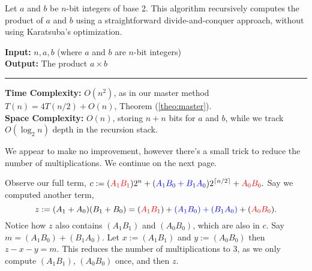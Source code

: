 \begin{Func}
    Let $a$ and $b$ be $n$-bit integers of base 2. This algorithm recursively computes the product of $a$ and $b$ using a straightforward divide-and-conquer approach, without using Karatsuba's optimization.

    \vspace{.5em}
    \noindent
    \textbf{Input:} $n, a, b$ (where $a$ and $b$ are $n$-bit integers)\\
    \textbf{Output:} The product $a \times b$\\

    \begin{algorithm}[H]
        \SetAlgoLined
    \end{algorithm}
    \noindent\rule{\textwidth}{0.4pt}

    \noindent
    \textbf{Time Complexity:} $O(n^2)$, as in our master method $T(n)=4T(n/2)+O(n)$, Theorem (\ref{theo:master}).\\
    \textbf{Space Complexity:} $O(n)$, storing $n+n$ bits for $a$ and $b$, while we track $O(\log_2 n)$ depth in the recursion stack.
\end{Func}
\noindent
We appear to make no improvement, however there's a small trick to reduce the number of multiplications. We continue on the next page.

\newpage

\noindent
Observe our full term, $c:=(\textcolor{red}{A_1B_1})2^{n}+(\textcolor{blue}{A_1B_0+B_1A_0})2^{\lceil n/2\rceil}+\textcolor{red}{A_0B_0}.$ Say we computed another term,
\[z:=(A_1+A_0)(B_1+B_0)=(\textcolor{red}{A_1B_1})+\textcolor{blue}{(A_1B_0)+(B_1A_0)}+(\textcolor{red}{A_0B_0}).\]
\noindent
Notice how $z$ also contains $(A_1B_1)$ and $(A_0B_0)$, which are also in $c$. Say
$m=(A_1B_0)+(B_1A_0)$. Let $x:=(A_1B_1)$ and $y:=(A_0B_0)$ then $z-x-y=m$. This reduces the number of multiplications to 3, as we only compute
 $(A_1B_1)$, $(A_0B_0)$ once, and then $z$.\\

